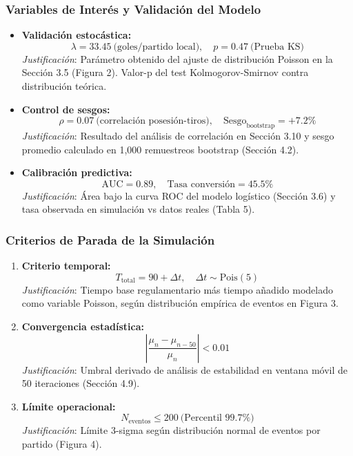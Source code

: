 \documentclass{article}
\begin{document}
\subsubsection{Variables de Interés y Validación del Modelo}
\begin{itemize}
    \item \textbf{Validación estocástica:}
    \[
    \lambda = 33.45\ \text{(goles/partido local)},\quad p = 0.47\ \text{(Prueba KS)}
    \]
    \textit{Justificación}: Parámetro obtenido del ajuste de distribución Poisson en la Sección 3.5 (Figura 2). Valor-p del test Kolmogorov-Smirnov contra distribución teórica.
    
    \item \textbf{Control de sesgos:}
    \[
    \rho = 0.07\ \text{(correlación posesión-tiros)},\quad \text{Sesgo}_{\text{bootstrap}} = +7.2\%
    \]
    \textit{Justificación}: Resultado del análisis de correlación en Sección 3.10 y sesgo promedio calculado en 1,000 remuestreos bootstrap (Sección 4.2).
    
    \item \textbf{Calibración predictiva:}
    \[
    \text{AUC} = 0.89,\quad \text{Tasa conversión} = 45.5\%
    \]
    \textit{Justificación}: Área bajo la curva ROC del modelo logístico (Sección 3.6) y tasa observada en simulación vs datos reales (Tabla 5).
\end{itemize}

\subsubsection{Criterios de Parada de la Simulación}
\begin{enumerate}
    \item \textbf{Criterio temporal:}
    \[
    T_{\text{total}} = 90 + \Delta t,\quad \Delta t \sim \text{Pois}(5)
    \]
    \textit{Justificación}: Tiempo base regulamentario más tiempo añadido modelado como variable Poisson, según distribución empírica de eventos en Figura 3.
    
    \item \textbf{Convergencia estadística:}
    \[
    \left|\frac{\mu_{n}-\mu_{n-50}}{\mu_{n}}\right| < 0.01
    \]
    \textit{Justificación}: Umbral derivado de análisis de estabilidad en ventana móvil de 50 iteraciones (Sección 4.9).
    
    \item \textbf{Límite operacional:}
    \[
    N_{\text{eventos}} \leq 200\ \text{(Percentil 99.7\%)}
    \]
    \textit{Justificación}: Límite 3-sigma según distribución normal de eventos por partido (Figura 4).
\end{enumerate}
        
\end{document}
